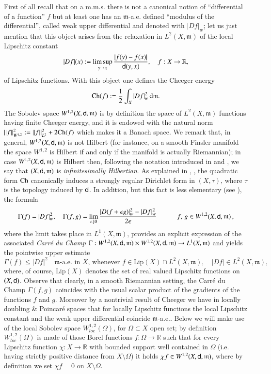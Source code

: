 \documentclass[11pt,reqno]{amsart}
\newcommand{\Lip}{\textrm{Lip}}
\newcommand{\Ch}{{\rm Ch}}
\newcommand{\mm}{\mathfrak m}
\newcommand{\sfd}{{\sf d}}
\renewcommand{\d}{{\rm{d}}}
\newcommand{\R}{\mathbb{R}}
\theoremstyle{definition}
\theoremstyle{remark}
\theoremstyle{remark}
\theoremstyle{remark}
\theoremstyle{remark}
\theoremstyle{remark}
\theoremstyle{remark}
\theoremstyle{remark}
\begin{document}
First of all recall that on a m.m.s. there is not a canonical notion of ``differential of a function'' $f$ but at least one has an $\mm$-a.e. defined  ``modulus of the differential'', called weak upper differential and denoted with $|Df|_w$; let us just mention that this object  arises from the relaxation
in $L^2(X,\mm)$ of the local Lipschitz constant 
\begin{equation}
  \label{eq:20}
  |D f|(x):=\limsup_{y\to x}\frac{|f(y)-f(x)|}{\sfd(y,x)},\quad
  f:X\to \R,
\end{equation}
of Lipschitz functions. With this object one defines the Cheeger energy
$$\Ch(f):=\frac 1 2 \int_X |Df|_w^2 \, \d \mm.$$
The  Sobolev space $W^{1,2}(X,\sfd,\mm)$ is by definition  the space of $L^2(X,\mm)$ functions having finite Cheeger energy, and it is endowed with the natural norm  $\|f\|^2_{W^{1,2}}:=\|f\|^2_{L^2}+2 \Ch(f)$ which makes it a Banach space. We remark that, in general, $W^{1,2}(X,\sfd,\mm)$ is not Hilbert (for instance, on a smooth Finsler manifold the space $W^{1,2}$ is Hilbert if and only if the manifold is actually Riemannian); in case  $W^{1,2}(X,\sfd,\mm)$ is  Hilbert then, following the notation introduced in \cite{AGS11b} and \cite{Gigli12}, we say that $(X,\sfd,\mm)$ is \emph{infinitesimally Hilbertian}.  As explained in \cite{AGS11b}, \cite{AGS12}, the quadratic form $\Ch$ canonically 
induces a strongly regular Dirichlet
form in $(X,\tau)$, where $\tau$ is the topology induced by $\sfd$. In addition, but this fact is less elementary (see \cite[\S4.3]{AGS11b}), the formula
$$
\Gamma(f)=|D f|_w^2,\quad
\Gamma(f,g)=\lim_{\epsilon\downarrow 0}\frac{|D(f+\epsilon g)|_w^2-|Df|_w^2}{2\epsilon}
\quad\qquad f,\,g\in W^{1,2}(X,\sfd,\mm)\, , $$%
where the limit takes place in $L^1(X,\mm)$, provides an explicit expression  
of the associated \emph{Carr\'e du Champ} $\Gamma:W^{1,2}(X,\sfd,\mm) \times W^{1,2}(X,\sfd,\mm)    \to
L^1(X,\mm)$ and 
yields the pointwise
upper estimate
\begin{equation}
  \label{eq:19}
  \Gamma(f) \leq |D f|^2\quad\text{$\mm$-a.e.\ in $X$,
    whenever }f\in \Lip(X)\cap L^2(X,\mm),\quad |D f|\in L^2(X,\mm),
\end{equation}
where, of course, $\Lip(X)$ denotes the set of real valued Lipschitz  functions on $(X,\sfd)$. Observe that clearly, in a smooth Riemannian setting, the Carr\'e du Champ $\Gamma(f,g)$ coincides  with the usual scalar product of the gradients of the functions $f$ and $g$. Moreover by a nontrivial result of Cheeger \cite{Cheeger97} we have in  locally doubling \& Poincar\'e spaces that for locally Lipschitz functions the local Lipschitz constant  and the weak upper differential coincide $\mm$-a.e..  Below we will make use of the local Sobolev space $W^{1,2}_{loc}(\Omega)$, for $\Omega\subset X$ open set; by definition $W^{1,2}_{loc}(\Omega)$ is made of those Borel functions $f:\Omega\to \R$ such that for every Lipschitz function $\chi: X\to \R$ with bounded support well contained in $\Omega$ (i.e. having strictly positive distance from $X\setminus \Omega$) it holds $\chi f \in W^{1,2}(X,\sfd,\mm)$, where by definition we set $\chi f=0$ on $X\setminus \Omega$.  
\end{document}
